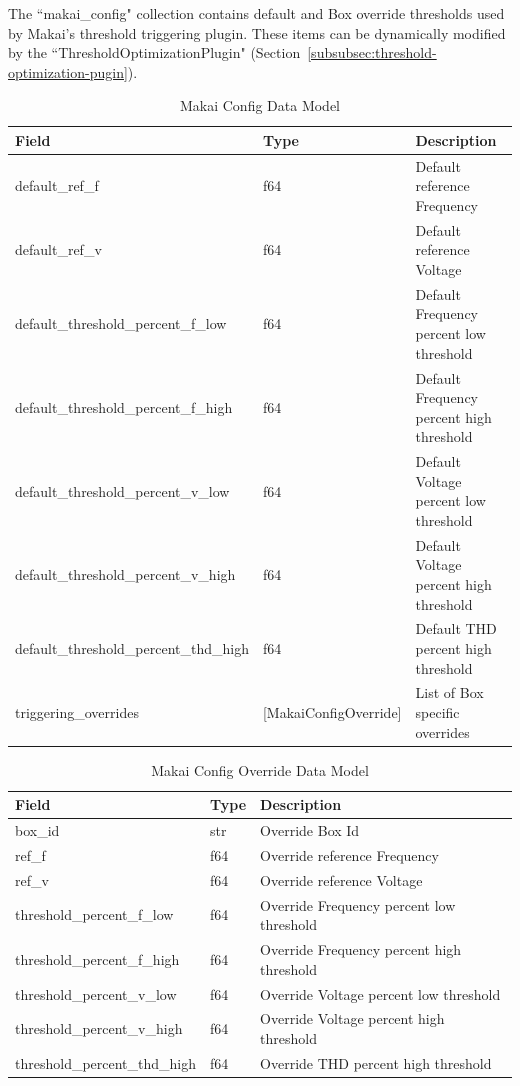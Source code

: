 The ``makai\_config" collection contains default and Box override thresholds used by Makai's threshold triggering plugin. These items can be dynamically modified by the ``ThresholdOptimizationPlugin" (Section~\ref{subsubsec:threshold-optimization-pugin}).

\begin{table}[H]
	\centering
	\caption{Makai Config Data Model}
	\begin{tabularx}{\textwidth}{XlX}
		\toprule
		\textbf{Field} & \textbf{Type} & \textbf{Description} \\
		\midrule
		default\_ref\_f & f64 & Default reference Frequency \\
		default\_ref\_v & f64 & Default reference Voltage \\
		default\_threshold\_percent\_f\_low & f64 & Default Frequency percent low threshold \\
		default\_threshold\_percent\_f\_high & f64 & Default Frequency percent high threshold \\
		default\_threshold\_percent\_v\_low & f64 & Default Voltage percent low threshold \\
		default\_threshold\_percent\_v\_high & f64 & Default Voltage percent high threshold \\
		default\_threshold\_percent\_thd\_high & f64 & Default THD percent high threshold \\
		triggering\_overrides & [MakaiConfigOverride] & List of Box specific overrides \\
		\bottomrule
	\end{tabularx}
	\label{table:makai_config}
\end{table}

\begin{table}[H]
	\centering
	\caption{Makai Config Override Data Model}
	\begin{tabularx}{\textwidth}{XlX}
		\toprule
		\textbf{Field} & \textbf{Type} & \textbf{Description} \\
		\midrule
		box\_id & str & Override Box Id \\
		ref\_f & f64 & Override reference Frequency \\
		ref\_v & f64 & Override reference Voltage \\
		threshold\_percent\_f\_low & f64 & Override Frequency percent low threshold \\
		threshold\_percent\_f\_high & f64 & Override Frequency percent high threshold \\
		threshold\_percent\_v\_low & f64 & Override Voltage percent low threshold \\
		threshold\_percent\_v\_high & f64 & Override Voltage percent high threshold \\
		threshold\_percent\_thd\_high & f64 & Override THD percent high threshold \\
		\bottomrule
	\end{tabularx}
	\label{table:makai_config_override}
\end{table}

